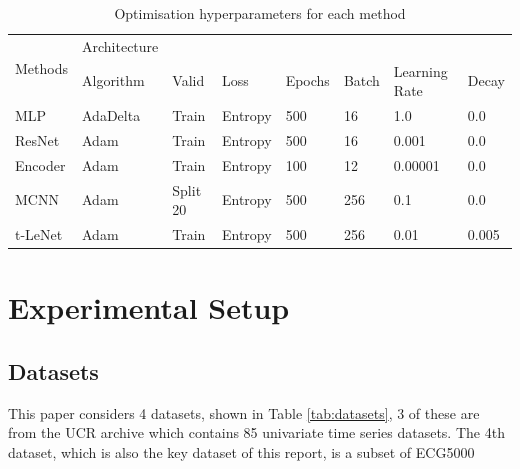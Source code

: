 \documentclass[journal]{IEEEtran}
\begin{document}
\begin{table}[]
    \renewcommand{\arraystretch}{1.3}
    \centering
    \caption{Optimisation hyperparameters for each method}
    \label{tab:methods-architecture-2}
    
    \begin{tabular}{llllllll}
    \hline
    \multirow{2}{*}{Methods} & Architecture &          &         &        &       &               &       \\ \cline{2-8} 
                             & Algorithm    & Valid    & Loss    & Epochs & Batch & Learning Rate & Decay \\ \hline
    MLP                      & AdaDelta     & Train    & Entropy & 500    & 16    & 1.0           & 0.0   \\
    ResNet                   & Adam         & Train    & Entropy & 500    & 16    & 0.001         & 0.0   \\
    Encoder                  & Adam         & Train    & Entropy & 100    & 12    & 0.00001       & 0.0   \\
    MCNN                     & Adam         & Split 20 & Entropy & 500    & 256   & 0.1           & 0.0   \\
    t-LeNet                  & Adam         & Train    & Entropy & 500    & 256   & 0.01          & 0.005 \\ \hline
    \end{tabular}
    
\end{table}

\section{Experimental Setup}

\subsection{Datasets}
This paper considers 4 datasets, shown in Table \ref{tab:datasets}, 3 of these are from the UCR archive \cite{dau2019ucr} which contains 85 univariate time series datasets. The 4th dataset, which is also the key dataset of this report, is a subset of ECG5000
\end{document}
